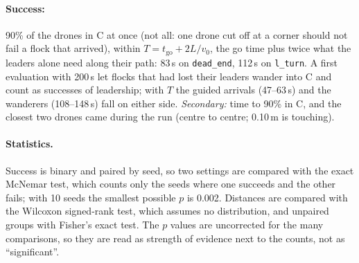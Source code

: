 \paragraph{Success:} 90\% of the drones in C at once (not all: one drone cut
off at a corner should not fail a flock that arrived), within
$T = t_{\mathrm{go}} + 2L/v_0$, the go time plus twice what the leaders alone
need along their path: 83\,s on \texttt{dead\_end}, 112\,s on
\texttt{l\_turn}. A first evaluation with 200\,s let flocks that had lost
their leaders wander into C and count as successes of leadership; with $T$
the guided arrivals (47--63\,s) and the wanderers (108--148\,s) fall on
either side. \emph{Secondary:} time to 90\% in C, and the closest two
drones came during the run (centre to centre; 0.10\,m is touching).

\paragraph{Statistics.} Success is binary and paired by seed, so two settings
are compared with the exact McNemar test, which counts only the seeds where
one succeeds and the other fails; with 10 seeds the smallest possible $p$ is
0.002. Distances are compared with the Wilcoxon signed-rank test, which
assumes no distribution, and unpaired groups with Fisher's exact test. The
$p$ values are uncorrected for the many comparisons, so they are read as
strength of evidence next to the counts, not as ``significant''.

